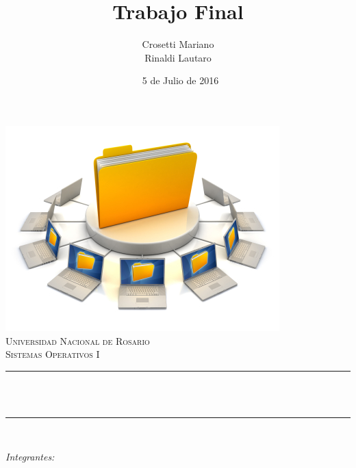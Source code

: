 \documentclass[12pt]{article}
\title{Trabajo Final}					%
\author{Crosetti Mariano \\Rinaldi Lautaro}					%
\date{\ 5 de Julio de 2016}						%
\makeatletter
\let\thetitle\@title
\let\theauthor\@author
\makeatother
\begin{document}

\begin{titlepage}
	\centering
    \vspace*{0.0 cm}
    \includegraphics[scale = 2.5]{Sharing1.jpg}\\[1 cm]	%
%
    \textsc{\LARGE Universidad Nacional de Rosario}\\[2.0 cm]	%

	\textsc{\large Sistemas Operativos I}\\[0.5 cm]		%
	\rule{\linewidth}{0.2 mm} \\[0.4 cm]
	{ \huge \bfseries \thetitle}\\
	\rule{\linewidth}{0.2 mm} \\[1.5 cm]
	
	\begin{minipage}{0.4\textwidth}
		\begin{center} \large
			\emph{Integrantes:}\\
			\theauthor\linebreak
			\end{center}
	\end{minipage}\\[2 cm]
	
 
	\vfill
	
\end{titlepage}


\tableofcontents
\pagebreak

\end{document}
